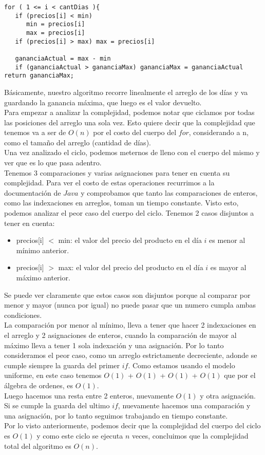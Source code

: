 \begin{verbatim}
for ( 1 <= i < cantDias ){
   if (precios[i] < min)
      min = precios[i]
      max = precios[i]
   if (precios[i] > max) max = precios[i]
   
   gananciaActual = max - min
   if (gananciaActual > gananciaMax) gananciaMax = gananciaActual
return gananciaMax;
\end{verbatim}

\indent Básicamente, nuestro algoritmo recorre linealmente el arreglo de los días y va guardando la ganancia máxima, que luego es el valor devuelto.\\
\indent Para empezar a analizar la complejidad, podemos notar que ciclamos por todas las posiciones del arreglo una sola vez. Esto quiere decir que la complejidad que tenemos va a ser de $O(n)$ por el costo del cuerpo del $for$, considerando a n, como el tamaño del arreglo (cantidad de días).\\
\indent Una vez analizado el ciclo, podemos meternos de lleno con el cuerpo del mismo y ver que es lo que pasa adentro.\\
\indent Tenemos 3 comparaciones y varias asignaciones para tener en cuenta su complejidad. Para ver el costo de estas operaciones recurrimos a la documentación de $Java$ y comprobamos que tanto las comparaciones de enteros, como las indexaciones en arreglos, toman un tiempo constante. Visto esto, podemos analizar el peor caso del cuerpo del ciclo. Tenemos 2 casos disjuntos a tener en cuenta:

\begin{itemize}
 \item precios[i] $<$ min: el valor del precio del producto en el día $i$ es menor al mínimo anterior.
 \item precios[i] $>$ max: el valor del precio del producto en el día $i$ es mayor al máximo anterior.
\end{itemize}

\indent Se puede ver claramente que estos casos son disjuntos porque al comparar por menor y mayor (nunca por igual) no puede pasar que un numero cumpla ambas condiciones.\\
\indent La comparación por menor al mínimo, lleva a tener que hacer 2 indexaciones en el arreglo y 2 asignaciones de enteros, cuando la comparación de mayor al máximo lleva a tener 1 sola indexación y una asignación. Por lo tanto consideramos el peor caso, como un arreglo estrictamente decreciente, adonde se cumple siempre la guarda del primer $if$. Como estamos usando el modelo uniforme, en este caso tenemos $O(1)$ + $O(1)$ + $O(1)$ + $O(1)$ que por el álgebra de ordenes, es $O(1)$. \\                                                   
\indent Luego hacemos una resta entre 2 enteros, nuevamente $O(1)$ y otra asignación. Si se cumple la guarda del ultimo $if$, nuevamente hacemos una comparación y una asignación, por lo tanto seguimos trabajando en tiempo constante.\\
\indent Por lo visto anteriormente, podemos decir que la complejidad del cuerpo del ciclo es $O(1)$ y como este ciclo se ejecuta $n$ veces, concluimos que la complejidad total del algoritmo es $O(n)$.\\



